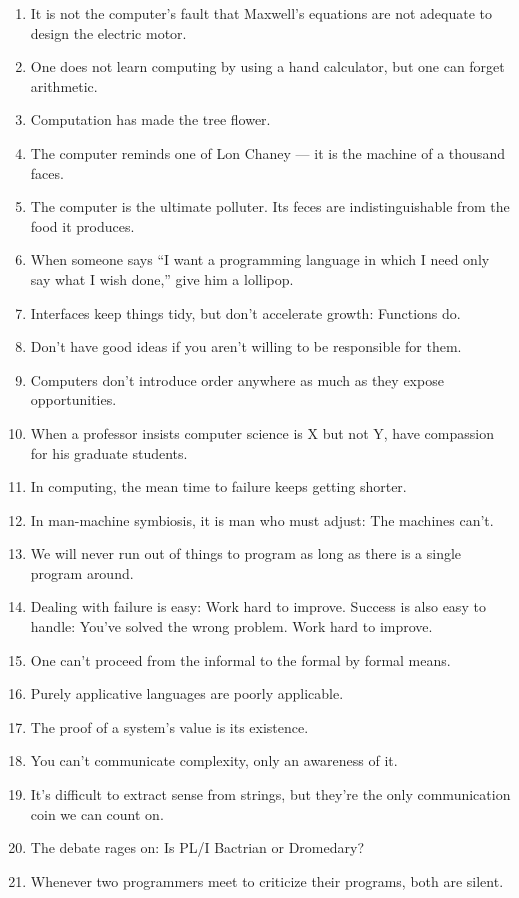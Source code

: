 \documentclass[letterpaper,11pt]{article}
\begin{document}
\begin{multicols}{2}
\begin{enumerate}[wide=0pt,label=\textbf{\arabic*.}]
\item It is not the computer's fault that Maxwell's equations are not adequate to design the electric motor.
\item One does not learn computing by using a hand calculator, but one can forget arithmetic.
\item Computation has made the tree flower.
\item The computer reminds one of Lon Chaney --- it is the machine of a thousand faces.
\item The computer is the ultimate polluter. Its feces are indistinguishable from the food it produces.
\item When someone says ``I want a programming language in which I need only say what I wish done,'' give him a lollipop.
\item Interfaces keep things tidy, but don't accelerate growth: Functions do.
\item Don't have good ideas if you aren't willing to be responsible for them.
\item Computers don't introduce order anywhere as much as they expose opportunities.
\item When a professor insists computer science is X but not Y, have compassion for his graduate students.
\item In computing, the mean time to failure keeps getting shorter.
\item In man-machine symbiosis, it is man who must adjust: The machines can't.
\item We will never run out of things to program as long as there is a single program around.
\item Dealing with failure is easy: Work hard to improve. Success is also easy to handle: You've solved the wrong problem. Work hard to improve.
\item One can't proceed from the informal to the formal by formal means.
\item Purely applicative languages are poorly applicable.
\item The proof of a system's value is its existence.
\item You can't communicate complexity, only an awareness of it.
\item It's difficult to extract sense from strings, but they're the only communication coin we can count on.
\item The debate rages on: Is PL/I Bactrian or Dromedary?
\item Whenever two programmers meet to criticize their programs, both are silent.

\end{enumerate}
\end{multicols}
\end{document}
